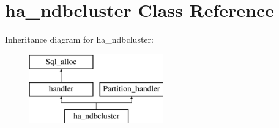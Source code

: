 \hypertarget{classha__ndbcluster}{}\section{ha\+\_\+ndbcluster Class Reference}
\label{classha__ndbcluster}
Inheritance diagram for ha\+\_\+ndbcluster\+:\begin{figure}[H]
\begin{center}
\leavevmode
\includegraphics[height=3.000000cm]{classha__ndbcluster}
\end{center}
\end{figure}
